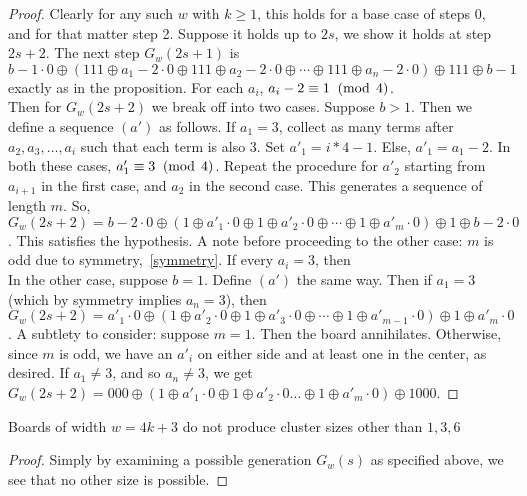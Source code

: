 \documentclass[12pt,letterpaper]{article}
\begin{document}
\begin{proof}
  Clearly for any such $w$ with $k\geq 1$, this holds for a base case of steps 0, and for that matter step 2. Suppose it holds up to $2s$, we show it holds at step $2s+2$. The next step $G_w(2s+1)$ is $$b-1\cdot 0\oplus (111\oplus a_1-2\cdot 0 \oplus 111\oplus a_2-2\cdot 0\oplus\cdots\oplus 111 \oplus a_n-2\cdot 0)\oplus 111 \oplus b-1$$ exactly as in the proposition. For each $a_i$, $a_i-2\equiv 1 \;\;(\operatorname{mod}\;4)$. \\
  Then for $G_w(2s+2)$ we break off into two cases. Suppose $b>1$. Then we define a sequence $(a')$ as follows. If $a_1=3$, collect as many terms after $a_2,a_3,\dots,a_i$ such that each term is also 3. Set $a'_1=i*4-1$. Else, $a'_1=a_1-2$. In both these cases, $a'_1\equiv 3 \;\;(\operatorname{mod}\;4)$. Repeat the procedure for $a'_2$ starting from $a_{i+1}$ in the first case, and $a_2$ in the second case. This generates a sequence of length $m$. So, $G_w(2s+2) = b-2\cdot 0\oplus (1\oplus a'_1\cdot 0\oplus 1 \oplus a'_2\cdot 0 \oplus\cdots\oplus 1\oplus a'_m\cdot 0)\oplus 1\oplus b-2\cdot 0$. This satisfies the hypothesis. A note before proceeding to the other case: $m$ is odd due to symmetry,~\cref{symmetry}. If every $a_i=3$, then  \\
  In the other case, suppose $b=1$. Define $(a')$ the same way. Then if $a_1=3$ (which by symmetry implies $a_n=3$), then $G_w(2s+2)= a'_1\cdot 0\oplus (1\oplus a'_2\cdot 0\oplus 1\oplus a'_3\cdot 0\oplus\cdots\oplus 1\oplus a'_{m-1}\cdot 0)\oplus 1\oplus a'_m\cdot 0$. A subtlety to consider: suppose $m=1$. Then the board annihilates. Otherwise, since $m$ is odd, we have an $a'_i$ on either side and at least one in the center, as desired. 
  If $a_1\neq 3$, and so $a_n\neq 3$, we get $G_w(2s+2) = 000\oplus(1\oplus a'_1\cdot 0\oplus 1\oplus a'_2\cdot 0\dots\oplus 1\oplus a'_m\cdot 0)\oplus 1000$. 
\end{proof}

\begin{cor}\label{cluster3mod4cor}
  Boards of width $w=4k+3$ do not produce cluster sizes other than $1,3,6$
\end{cor}
\begin{proof}
  Simply by examining a possible generation $G_w(s)$ as specified above, we see that no other size is possible.
\end{proof}
\end{document}
